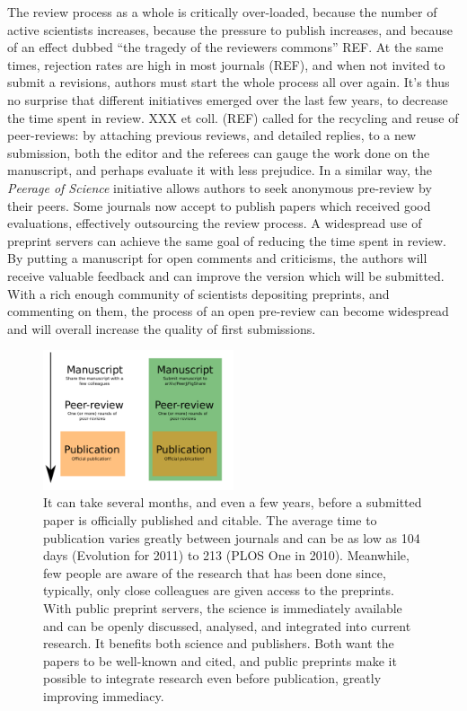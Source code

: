 \documentclass[letterpaper,twocolumn,superscriptaddress,showkeys]{revtex4}
\begin{document}
The review process as a whole is critically over-loaded, because the number of
active scientists increases, because the pressure to publish increases, and
because of an effect dubbed ``the tragedy of the reviewers commons'' REF.  At
the same times, rejection rates are high in most journals (REF), and when not
invited to submit a revisions, authors must start the whole process all over
again. It's thus no surprise that different initiatives emerged over the last
few years, to decrease the time spent in review. XXX et coll. (REF) called for
the recycling and reuse of peer-reviews: by attaching previous reviews, and
detailed replies, to a new submission, both the editor and the referees can
gauge the work done on the manuscript, and perhaps evaluate it with less
prejudice. In a similar way, the \emph{Peerage of Science} initiative allows
authors to seek anonymous pre-review by their peers. Some journals now accept
to publish papers which received good evaluations, effectively outsourcing the
review process. A widespread use of preprint servers can achieve the same goal
of reducing the time spent in review. By putting a manuscript for open
comments and criticisms, the authors will receive valuable feedback and can
improve the version which will be submitted. With a rich enough community of
scientists depositing preprints, and commenting on them, the process of an open
pre-review can become widespread and will overall increase the quality of
first submissions.

\begin{figure}[ht!] \centering\includegraphics[width=0.50\textwidth]{map.pdf}
\caption { It can take several months, and even a few years, before a submitted
paper is officially published and citable.  The average time to publication
varies greatly between journals and can be as low as 104 days (Evolution for
2011) to 213 (PLOS One in 2010).  Meanwhile, few people are aware of the
research that has been done since, typically, only close colleagues are given
access to the preprints. With public preprint servers, the science is
immediately available and can be openly discussed, analysed, and integrated into
current research. It benefits both science and publishers. Both want the papers
to be well-known and cited, and public preprints make it possible to integrate
research even before publication, greatly improving immediacy.  }
\label{fig:map} \end{figure}
\end{document}
